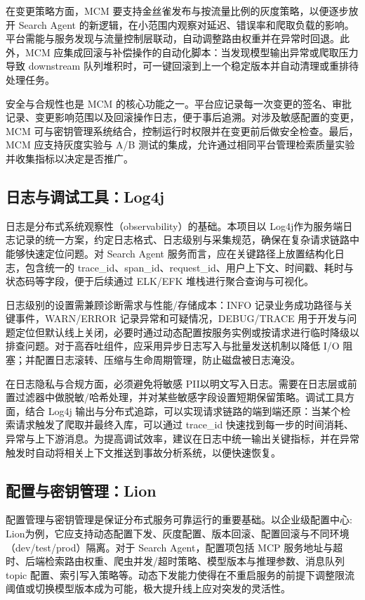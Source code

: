 在变更策略方面，MCM 要支持金丝雀发布与按流量比例的灰度策略，以便逐步放开 Search Agent 的新逻辑，在小范围内观察对延迟、错误率和爬取负载的影响。平台需能与服务发现与流量控制层联动，自动调整路由权重并在异常时回退。此外，MCM 应集成回滚与补偿操作的自动化脚本：当发现模型输出异常或爬取压力导致 downstream 队列堆积时，可一键回滚到上一个稳定版本并自动清理或重排待处理任务。

安全与合规性也是 MCM 的核心功能之一。平台应记录每一次变更的签名、审批记录、变更影响范围以及回滚操作日志，便于事后追溯。对涉及敏感配置的变更，MCM 可与密钥管理系统结合，控制运行时权限并在变更前后做安全检查。最后，MCM 应支持灰度实验与 A/B 测试的集成，允许通过相同平台管理检索质量实验并收集指标以决定是否推广。

\subsection{日志与调试工具：Log4j}
日志是分布式系统观察性（observability）的基础。本项目以 Log4j\cite{Mizouchi2019PADLA}作为服务端日志记录的统一方案，约定日志格式、日志级别与采集规范，确保在复杂请求链路中能够快速定位问题。对 Search Agent 服务而言，应在关键路径上放置结构化日志，包含统一的 trace\_id、span\_id、request\_id、用户上下文、时间戳、耗时与状态码等字段，便于后续通过 ELK/EFK 堆栈进行聚合查询与可视化。

日志级别的设置需兼顾诊断需求与性能/存储成本：INFO 记录业务成功路径与关键事件，WARN/ERROR 记录异常和可疑情况，DEBUG/TRACE 用于开发与问题定位但默认线上关闭，必要时通过动态配置按服务实例或按请求进行临时降级以排查问题。对于高吞吐组件，应采用异步日志写入与批量发送机制以降低 I/O 阻塞；并配置日志滚转、压缩与生命周期管理，防止磁盘被日志淹没。

在日志隐私与合规方面，必须避免将敏感 PII以明文写入日志。需要在日志层或前置过滤器中做脱敏/哈希处理，并对某些敏感字段设置短期保留策略。调试工具方面，结合 Log4j 输出与分布式追踪，可以实现请求链路的端到端还原：当某个检索请求触发了爬取并最终入库，可以通过 trace\_id 快速找到每一步的时间消耗、异常与上下游消息。为提高调试效率，建议在日志中统一输出关键指标，并在异常触发时自动将相关上下文推送到事故分析系统，以便快速恢复。

\subsection{配置与密钥管理：Lion}
配置管理与密钥管理是保证分布式服务可靠运行的重要基础。以企业级配置中心: Lion\cite{Meituan2014ConfigManagement}为例，它应支持动态配置下发、灰度配置、版本回滚、配置回滚与不同环境（dev/test/prod）隔离。对于 Search Agent，配置项包括 MCP 服务地址与超时、后端检索路由权重、爬虫并发/超时策略、模型版本与推理参数、消息队列 topic 配置、索引写入策略等。动态下发能力使得在不重启服务的前提下调整限流阈值或切换模型版本成为可能，极大提升线上应对突发的灵活性。

